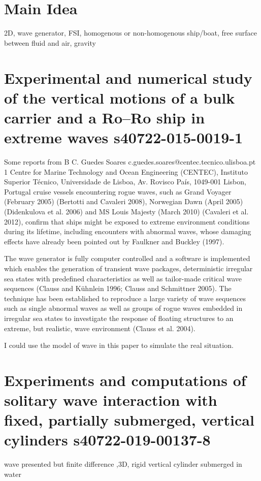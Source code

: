 \documentclass[a4paper,12pt]{article} %
\begin{document}
\setlength{\parskip}{1em} 
\setlength{\parindent}{0pt}
\section{Main Idea}
2D, wave generator, FSI, homogenous or non-homogenous ship/boat, free surface between fluid and air, gravity



\section{Experimental and numerical study of the vertical motions
of a bulk carrier and a Ro–Ro ship in extreme waves s40722-015-0019-1}
Some reports from B C. Guedes Soares
c.guedes.soares@centec.tecnico.ulisboa.pt
1 Centre for Marine Technology and Ocean Engineering
(CENTEC), Instituto Superior Técnico, Universidade de
Lisboa, Av. Rovisco País, 1049-001 Lisbon, Portugal
cruise vessels encountering rogue waves, such as Grand
Voyager (February 2005) (Bertotti and Cavaleri 2008), Norwegian
Dawn (April 2005) (Didenkulova et al. 2006) and MS
Louis Majesty (March 2010) (Cavaleri et al. 2012), confirm that ships might be exposed to extreme environment conditions
during its lifetime, including encounters with abnormal
waves, whose damaging effects have already been pointed
out by Faulkner and Buckley (1997).

The wave generator is fully computer controlled
and a software is implemented which enables the generation
of transient wave packages, deterministic irregular sea
states with predefined characteristics as well as tailor-made
critical wave sequences (Clauss and Kühnlein 1996; Clauss
and Schmittner 2005). The technique has been established to
reproduce a large variety of wave sequences such as single
abnormal waves as well as groups of rogue waves embedded
in irregular sea states to investigate the response of floating
structures to an extreme, but realistic, wave environment
(Clauss et al. 2004).

I could use the model of wave in this paper to simulate the real situation. 


\section{Experiments and computations of solitary wave interaction with fixed,
partially submerged, vertical cylinders s40722-019-00137-8}
wave presented but finite difference ,3D, rigid vertical cylinder submerged in water
\end{document}
